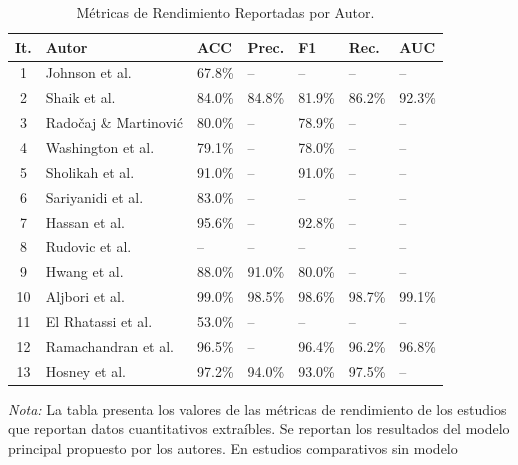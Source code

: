 \documentclass[ASNA,twocolumn]{USG}
\begin{document}
	\begin{table}[!t]
		\centering
		\caption{Métricas de Rendimiento Reportadas por Autor.\label{tab9}}
		{\setlength{\tabcolsep}{4pt}
			\begin{tabular*}{\textwidth}{@{\extracolsep\fill}cllllll@{\extracolsep\fill}}
				\toprule
				\textbf{It.} & \textbf{Autor} & \textbf{ACC} & \textbf{Prec.} & \textbf{F1} &
				\textbf{Rec.} & \textbf{AUC} \\
				\midrule
				1  & Johnson et al.\ \cite{Johnson2025}       & 67.8\% & --     & --     & --     & -- \\
				2  & Shaik et al.\ \cite{Shaik2025}           & 84.0\% & 84.8\% & 81.9\% & 86.2\% & 92.3\% \\
				3  & Radočaj \& Martinović \cite{Radocaj2025} & 80.0\% & --     & 78.9\% & --     & -- \\
				4  & Washington et al.\ \cite{Washington2022} & 79.1\% & --     & 78.0\% & --     & -- \\
				5  & Sholikah et al.\ \cite{Sholikah2024}     & 91.0\% & --     & 91.0\% & --     & -- \\
				6  & Sariyanidi et al.\ \cite{Sariyanidi2025} & 83.0\% & --     & --     & --     & -- \\
				7  & Hassan et al.\ \cite{Hassan2025}         & 95.6\% & --     & 92.8\% & --     & -- \\
				8  & Rudovic et al.\ \cite{Rudovic2019}       & --     & --     & --     & --     & -- \\
				9  & Hwang et al.\ \cite{Hwang2024}           & 88.0\% & 91.0\% & 80.0\% & --     & -- \\
				10 & Aljbori et al.\ \cite{Aljbori2025}       & 99.0\% & 98.5\% & 98.6\% & 98.7\% & 99.1\% \\
				11 & El Rhatassi et al.\ \cite{Rhatassi2025}  & 53.0\% & --     & --     & --     & -- \\
				12 & Ramachandran et al.\ \cite{Ramachandran2025} & 96.5\% & -- & 96.4\% & 96.2\% & 96.8\% \\
				13 & Hosney et al.\ \cite{Hosney2024}         & 97.2\% & 94.0\% & 93.0\% & 97.5\% & -- \\
				\bottomrule
		\end{tabular*}}
		\begin{tablenotes}
			\item {\it Nota:} La tabla presenta los valores de las métricas de rendimiento de
			los estudios que reportan datos cuantitativos extraíbles. Se reportan los resultados
			del modelo principal propuesto por los autores. En estudios comparativos sin modelo

\end{tablenotes}
\end{table}
\end{document}
